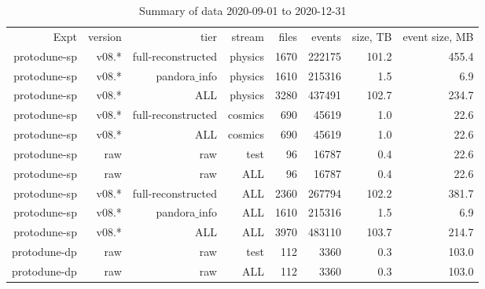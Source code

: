 \documentclass[10pt]{article}
\begin{document}
 
\begin{table}
\begin{tabular}{rrrrrrrr}
Expt& version& tier& stream&files& events& size, TB& event size, MB\\
protodune-sp& v08.*& full-reconstructed& physics& 1670& 222175&      101.2&      455.4\\
protodune-sp& v08.*& pandora$\_$info& physics& 1610& 215316&        1.5&        6.9\\
protodune-sp& v08.*& ALL& physics& 3280& 437491&      102.7&      234.7\\
protodune-sp& v08.*& full-reconstructed& cosmics& 690& 45619&        1.0&       22.6\\
protodune-sp& v08.*& ALL& cosmics& 690& 45619&        1.0&       22.6\\
protodune-sp& raw& raw& test& 96& 16787&        0.4&       22.6\\
protodune-sp& raw& raw& ALL& 96& 16787&        0.4&       22.6\\
protodune-sp& v08.*& full-reconstructed& ALL& 2360& 267794&      102.2&      381.7\\
protodune-sp& v08.*& pandora$\_$info& ALL& 1610& 215316&        1.5&        6.9\\
protodune-sp& v08.*& ALL& ALL& 3970& 483110&      103.7&      214.7\\
protodune-dp& raw& raw& test& 112& 3360&        0.3&      103.0\\
protodune-dp& raw& raw& ALL& 112& 3360&        0.3&      103.0\\
\end{tabular}
\caption{Summary of data 2020-09-01 to 2020-12-31}
\end{table}
\end{document}
